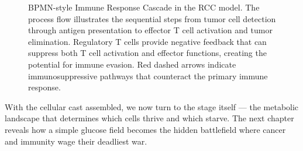 \begin{figure}[htbp]
\begin{tikzpicture}
\end{tikzpicture}
\caption{BPMN-style Immune Response Cascade in the RCC model. The process flow illustrates the sequential steps from tumor cell detection through antigen presentation to effector T cell activation and tumor elimination. Regulatory T cells provide negative feedback that can suppress both T cell activation and effector functions, creating the potential for immune evasion. Red dashed arrows indicate immunosuppressive pathways that counteract the primary immune response.}
\label{fig:immune_response_cascade}
\end{figure}

With the cellular cast assembled, we now turn to the stage itself --- the metabolic landscape that determines which cells thrive and which starve. The next chapter reveals how a simple glucose field becomes the hidden battlefield where cancer and immunity wage their deadliest war.
